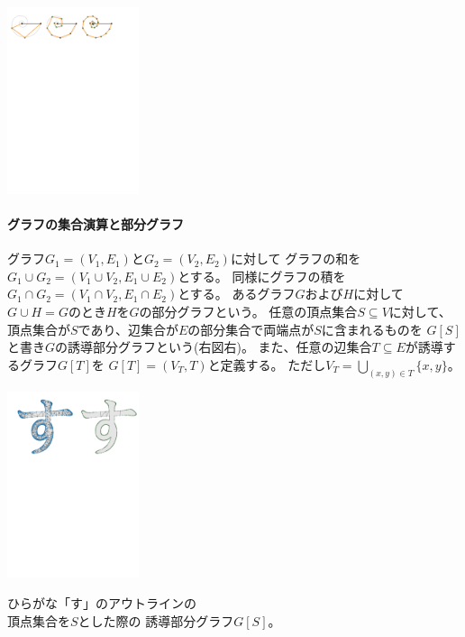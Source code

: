 \begin{paracol}{2}
\vspace{1.\intextsep}
\includegraphics[width=0.29\textwidth]{figures/edge_subdivision.pdf}
\end{paracol}

\begin{paracol}{2}
\paragraph{グラフの集合演算と部分グラフ}
グラフ$G_1 = (V_1, E_1)$と$G_2=(V_2, E_2)$に対して
グラフの和を$G_1 \cup G_2 = (V_1 \cup V_2, E_1 \cup E_2)$とする。
同様にグラフの積を$G_1 \cap G_2 = (V_1 \cap V_2, E_1 \cap E_2)$とする。
あるグラフ$G$および$H$に対して$G \cup H = G$のとき$H$を$G$の部分グラフという。
任意の頂点集合$S \subseteq V$に対して、
頂点集合が$S$であり、辺集合が$E$の部分集合で両端点が$S$に含まれるものを
$G[S]$と書き$G$の誘導部分グラフという(右図右)。
また、任意の辺集合$T\subseteq E$が誘導するグラフ$G[T]$を
$G[T]=(V_T, T)$と定義する。
ただし$V_T=\bigcup\limits_{(x,y)\in T}\{x, y\}$。

\switchcolumn
\centering
\includegraphics[width=0.29\textwidth]{figures/connect_su.pdf}

{\small ひらがな「す」のアウトラインの\\頂点集合を$S$とした際の
誘導部分グラフ$G[S]$。~~~~~~~~~~~~~~~~~~~~~~~~~}
\end{paracol}

